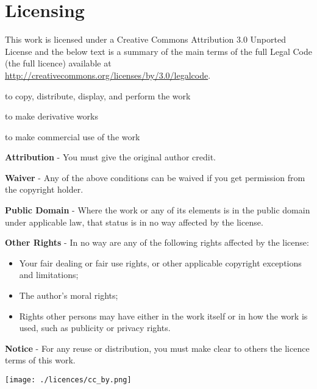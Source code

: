 \chapter{Licensing}

This work is licensed under a Creative Commons Attribution 3.0 Unported License and
the below text is a summary of the main terms of the full Legal Code (the full licence) available at
\url{http://creativecommons.org/licenses/by/3.0/legalcode}.

\begin{description}[style=multiline,labelindent=0cm,align=left,leftmargin=1.5cm]
\item[You are free:] \hfill

to copy, distribute, display, and perform the work 

to make derivative works

to make commercial use of the work
  
\item[Under the following conditions:] \hfill

  \textbf{Attribution} - You must give the original author credit.
  
\item[With the understanding that:] \hfill

  \textbf{Waiver} - Any of the above conditions can be waived if you get permission from the
  copyright holder.
  
  \textbf{Public Domain} - Where the work or any of its elements is in the public domain
  under applicable law, that status is in no way affected by the license.
  
  \textbf{Other Rights} - In no way are any of the following rights affected by the license:
  
  \begin{itemize}
    \item Your fair dealing or fair use rights, or other applicable copyright exceptions and limitations;
  
    \item The author's moral rights;
  
    \item Rights other persons may have either in the work itself or in how the work is used, such
    as publicity or privacy rights.
  \end{itemize}
  
  \textbf{Notice} - For any reuse or distribution, you must make clear to others the
  licence terms of this work.
  
\end{description}

\vspace{\fill}

\begin{center}
\texttt{[image: ./licences/cc\_by.png]}
\end{center}
